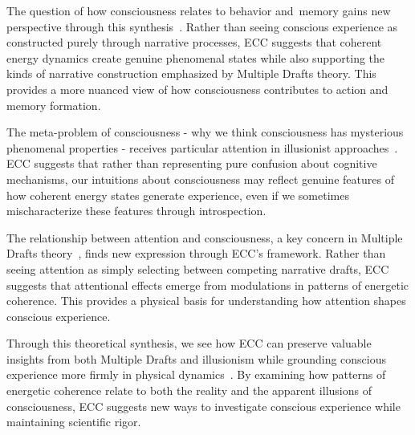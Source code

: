 The question of how consciousness relates to behavior and~memory gains new perspective through this synthesis~\cite{Dennett1992, Clark2016}. Rather than seeing conscious experience as constructed purely through narrative processes, ECC suggests that coherent energy dynamics create genuine phenomenal states while also supporting the kinds of narrative construction emphasized by Multiple Drafts theory. This provides a more nuanced view of how consciousness contributes to action and memory formation.

The meta-problem of consciousness - why we think consciousness has mysterious phenomenal properties - receives particular attention in illusionist approaches~\cite{Frankish2019, Chalmers2018}. ECC suggests that rather than representing pure confusion about cognitive mechanisms, our intuitions about consciousness may reflect genuine features of how coherent energy states generate experience, even if we sometimes mischaracterize these features through introspection.

The relationship between attention and consciousness, a key concern in Multiple Drafts theory~\cite{VanGulick2018, Graziano2019}, finds new expression through ECC's framework. Rather than seeing attention as simply selecting between competing narrative drafts, ECC suggests that attentional effects emerge from modulations in patterns of energetic coherence. This provides a physical basis for understanding how attention shapes conscious experience.

Through this theoretical synthesis, we see how ECC can preserve valuable insights from both Multiple Drafts and illusionism while grounding conscious experience more firmly in physical dynamics~\cite{Dennett1991, Frankish2019}. By examining how patterns of energetic coherence relate to both the reality and the apparent illusions of consciousness, ECC suggests new ways to investigate conscious experience while maintaining scientific rigor.

